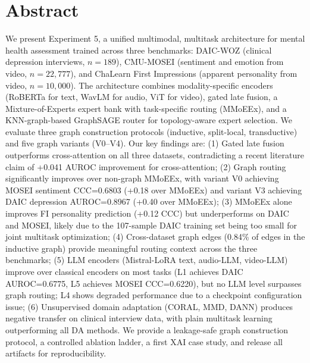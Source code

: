 \documentclass[12pt,oneside]{book}
\begin{document}
\chapter*{Abstract}

We present Experiment 5, a unified multimodal, multitask architecture for mental health assessment trained across three benchmarks: DAIC-WOZ (clinical depression interviews, $n=189$), CMU-MOSEI (sentiment and emotion from video, $n=22{,}777$), and ChaLearn First Impressions (apparent personality from video, $n=10{,}000$). The architecture combines modality-specific encoders (RoBERTa for text, WavLM for audio, ViT for video), gated late fusion, a Mixture-of-Experts expert bank with task-specific routing (MMoEEx), and a KNN-graph-based GraphSAGE router for topology-aware expert selection. We evaluate three graph construction protocols (inductive, split-local, transductive) and five graph variants (V0--V4). Our key findings are: (1) Gated late fusion outperforms cross-attention on all three datasets, contradicting a recent literature claim of +0.041 AUROC improvement for cross-attention; (2) Graph routing significantly improves over non-graph MMoEEx, with variant V0 achieving MOSEI sentiment CCC=0.6803 (+0.18 over MMoEEx) and variant V3 achieving DAIC depression AUROC=0.8967 (+0.40 over MMoEEx); (3) MMoEEx alone improves FI personality prediction (+0.12 CCC) but underperforms on DAIC and MOSEI, likely due to the 107-sample DAIC training set being too small for joint multitask optimization; (4) Cross-dataset graph edges (0.84\% of edges in the inductive graph) provide meaningful routing context across the three benchmarks; (5) LLM encoders (Mistral-LoRA text, audio-LLM, video-LLM) improve over classical encoders on most tasks (L1 achieves DAIC AUROC=0.6775, L5 achieves MOSEI CCC=0.6220), but no LLM level surpasses graph routing; L4 shows degraded performance due to a checkpoint configuration issue; (6) Unsupervised domain adaptation (CORAL, MMD, DANN) produces negative transfer on clinical interview data, with plain multitask learning outperforming all DA methods. We provide a leakage-safe graph construction protocol, a controlled ablation ladder, a first XAI case study, and release all artifacts for reproducibility.

\end{document}
